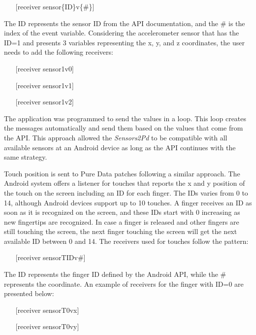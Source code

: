 \begin{itemize}\itemsep0em
\item[] [receiver sensor\{ID\}v\{\#\}]
\end{itemize}

The ID represents the sensor ID from the API documentation, and the \# is the index of the event variable.
Considering the accelerometer sensor that has the ID=1 and presents 3 variables representing the x, y, and z coordinates, the user needs to add the following receivers:

\begin{itemize}\itemsep0em
\item[]    [receiver sensor1v0]
\item[]    [receiver sensor1v1]
\item[]    [receiver sensor1v2]
\end{itemize}

The application was programmed to send the values in a loop.
This loop creates the messages automatically and send them based on the values that come from the API.
This approach allowed the \textit{Sensors2Pd} to be compatible with all available sensors at an Android device as long as the API continues with the same strategy.

Touch position is sent to Pure Data patches following a similar approach.
The Android system offers a listener for touches that reports the x and y position of the touch on the screen including an ID for each finger.
The IDs varies from 0 to 14, although Android devices support up to 10 touches.
A finger receives an ID as soon as it is recognized on the screen, and these IDs start with 0 increasing as new fingertips are recognized.
In case a finger is released and other fingers are still touching the screen, the next finger touching the screen will get the next available ID between 0 and 14.
The receivers used for touches follow the pattern:

\begin{itemize}\itemsep0em
\item[]  [receiver sensorT{ID}v{\#}]
\end{itemize}

The ID represents the finger ID defined by the Android API, while the \# represents the coordinate.
An example of receivers for the finger with ID=0 are presented below:

\begin{itemize}\itemsep0em
\item[]   [receiver sensorT0vx]
\item[]   [receiver sensorT0vy]
\end{itemize}

